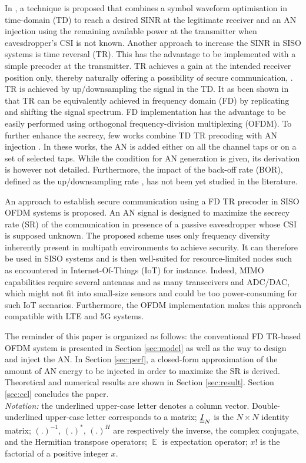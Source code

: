 \documentclass[conference]{IEEEtran}
\begin{document}
In \cite{PLS_litt4}, a technique is proposed that combines a symbol waveform optimisation in time-domain (TD) to reach a desired SINR at the legitimate receiver and an AN injection using the remaining available power at the transmitter when eavesdropper's CSI is not known. Another approach to increase the SINR in SISO systems is time reversal (TR). This has the advantage to be implemented with a simple precoder at the transmitter. TR achieves a gain at the intended receiver position only, thereby naturally offering a possibility of secure communication, \cite{otges}. TR is achieved by up/downsampling the signal in the TD. It as been shown in  \cite{TR_FD_TD} that TR can be equivalently achieved in frequency domain (FD) by replicating and shifting the signal spectrum. FD implementation has the advantage to be easily performed using orthogonal frequency-division multiplexing (OFDM). To further enhance the secrecy, few works combine TD TR precoding with AN injection \cite{TR_AN_2018_xu,TR_AN_2017_Li,TR_AN_2018_Li}. In these works, the AN is added either on all the channel taps or on a set of selected taps. While the condition for AN generation is given, its derivation is however not detailed. Furthermore, the impact of the back-off rate (BOR), defined as the up/downsampling rate \cite{TR_bor}, has not been yet studied in the literature. 

An approach to establish secure communication using a FD TR precoder in SISO OFDM systems is proposed. An AN signal is designed to maximize the secrecy rate (SR) of the communication in presence of a passive eavesdropper whose CSI is supposed unknown. The proposed scheme uses only frequency diversity inherently present in multipath environments to achieve security. It can therefore be used in SISO systems and is then well-suited for resource-limited nodes such as encountered in Internet-Of-Things (IoT) for instance.  Indeed, MIMO capabilities require several antennas and as many transceivers and ADC/DAC, which might not fit into small-size sensors and could  be too power-consuming for such IoT scenarios. Furthermore, the OFDM implementation makes this approach compatible with LTE and 5G systems.

The reminder of this paper is organized as follows: the conventional FD TR-based OFDM system is presented in Section \ref{sec:model} as well as the way to design and inject the AN. In Section \ref{sec:perf}, a closed-form approximation of the amount of AN energy to be injected in order to maximize the SR is derived. Theoretical and numerical results are shown in Section \ref{sec:result}. Section \ref{sec:ccl} concludes the paper. \\
\textit{Notation:} the underlined upper-case letter denotes a column vector. Double-underlined upper-case letter corresponds to a matrix; $\underline{\underline{I}}_N$ is the $N\times N$ identity matrix; $\left(.\right)^{-1}$, $\left( . \right)^*$, $\left(.\right)^H$ are respectively the inverse, the complex conjugate, and the Hermitian transpose operators; $\mathop{\mathbb{E}}$ is expectation operator; $x!$ is the factorial of a positive integer $x$.
\end{document}

